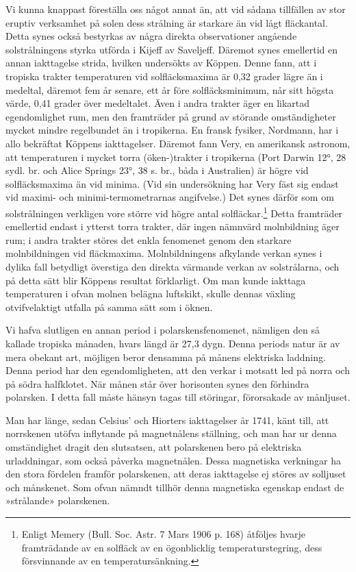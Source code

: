 \documentclass[a4paper, 12pt, oneside, swedish]{article}
\begin{document}
Vi kunna knappast föreställa oss något annat än, att vid sådana tillfällen av stor eruptiv verksamhet på solen dess strålning är starkare än vid lågt fläckantal. Detta synes också bestyrkas av några direkta observationer angående solstrålningens styrka utförda i Kijeff av Saveljeff. Däremot synes emellertid en annan iakttagelse strida, hvilken undersökts av Köppen. Denne fann, att i tropiska trakter temperaturen vid solfläcksmaxima är 0,32 grader lägre än i medeltal, däremot fem år senare, ett år före solfläcksminimum, når sitt högsta värde, 0,41 grader över medeltalet. Även i andra trakter äger en likartad egendomlighet rum, men den framträder på grund av störande omständigheter mycket mindre regelbundet än i tropikerna. En fransk fysiker, Nordmann, har i allo bekräftat Köppens iakttagelser. Däremot fann Very, en amerikansk astronom, att temperaturen i mycket torra (öken-)trakter i tropikerna (Port Darwin 12°, 28 sydl. br. och Alice Springs 23°, 38 s. br., båda i Australien) är högre vid solfläcksmaxima än vid minima. (Vid sin undersökning har Very fäst sig endast vid maximi- och minimi-termometrarnas angifvelse.) Det synes därför som om solstrålningen verkligen vore större vid högre antal solfläckar.\footnote{Enligt Memery (Bull. Soc. Astr. 7 Mars 1906 p. 168) åtföljes hvarje framträdande av en solfläck av en ögonblicklig temperaturstegring, dess försvinnande av en temperatursänkning.} Detta framträder emellertid endast i ytterst torra trakter, där ingen nämnvärd molnbildning äger rum; i andra trakter störes det enkla fenomenet genom den starkare molnbildningen vid fläckmaxima. Molnbildningens afkylande verkan synes i dylika fall betydligt överstiga den direkta värmande verkan av solstrålarna, och på detta sätt blir Köppens resultat förklarligt. Om man kunde iakttaga temperaturen i ofvan molnen belägna luftskikt, skulle dennas växling otvifvelaktigt utfalla på samma sätt som i öknen.

Vi hafva slutligen en annan period i polarskensfenomenet, nämligen den så kallade tropiska månaden, hvars längd är 27,3 dygn. Denna periods natur är av mera obekant art, möjligen beror densamma på månens elektriska laddning. Denna period har den egendomligheten, att den verkar i motsatt led på norra och på södra halfklotet. När månen står över horisonten synes den förhindra polarsken. I detta fall måste hänsyn tagas till störingar, förorsakade av månljuset.

Man har länge, sedan Celsius' och Hiorters iakttagelser år 1741, känt till, att norrskenen utöfva inflytande på magnetnålens ställning, och man har ur denna omständighet dragit den slutsatsen, att polarskenen bero på elektriska urladdningar, som också påverka magnetnålen. Dessa magnetiska verkningar ha den stora fördelen framför polarskenen, att deras iakttagelse ej störes av solljuset och månskenet. Som ofvan nämndt tillhör denna magnetiska egenskap endast de »strålande» polarskenen.
\end{document}
